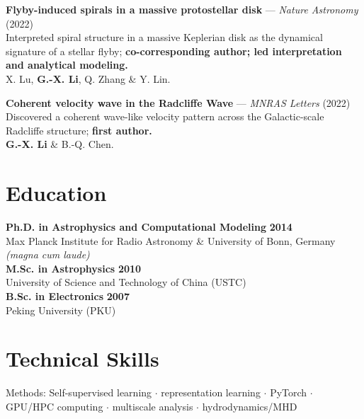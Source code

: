 \documentclass[10pt]{article}
\newcommand{\disc}[1]{{\fontsize{10.5}{12.6}\selectfont\textbf{#1}}}
\begin{document}
\disc{Flyby-induced spirals in a massive protostellar disk} --- \textit{Nature Astronomy} (2022)\\
Interpreted spiral structure in a massive Keplerian disk as the dynamical signature of a stellar
flyby; \textbf{co-corresponding author; led interpretation and analytical modeling.}\\
X. Lu, \textbf{G.-X. Li}, Q. Zhang \& Y. Lin.
\vspace{22pt}

\disc{Coherent velocity wave in the Radcliffe Wave} --- \textit{MNRAS Letters} (2022)\\
Discovered a coherent wave-like velocity pattern across the Galactic-scale Radcliffe structure;
\textbf{first author.}\\
\textbf{G.-X. Li} \& B.-Q. Chen.

\vspace{11pt}
\section*{Education}
\textbf{Ph.D. in Astrophysics and Computational Modeling} \hfill \textbf{2014}\\
Max Planck Institute for Radio Astronomy \& University of Bonn, Germany \textit{(magna cum laude)}\\[1pt]
\textbf{M.Sc. in Astrophysics} \hfill \textbf{2010}\\
University of Science and Technology of China (USTC)\\[1pt]
\textbf{B.Sc. in Electronics} \hfill \textbf{2007}\\
Peking University (PKU)

\vspace{6pt}
\section*{Technical Skills}
Methods: Self-supervised learning $\cdot$ representation learning $\cdot$ PyTorch $\cdot$ GPU/HPC
computing $\cdot$ multiscale analysis $\cdot$ hydrodynamics/MHD
\end{document}
